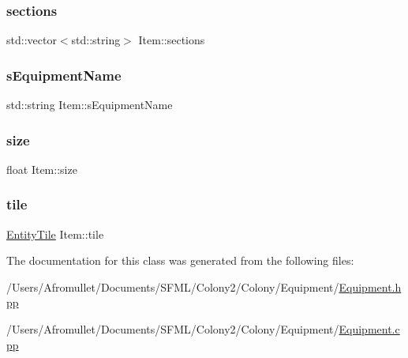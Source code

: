 \mbox{\label{class_item_ad0dfdfafbff3d22f196c19db4ce1eb40}} 
\subsubsection{\texorpdfstring{sections}{sections}}
{\footnotesize\ttfamily std\+::vector$<$std\+::string$>$ Item\+::sections}

\mbox{\label{class_item_ab551fd7ec7c75a6d125cad56fe84b30a}} 
\subsubsection{\texorpdfstring{s\+Equipment\+Name}{sEquipmentName}}
{\footnotesize\ttfamily std\+::string Item\+::s\+Equipment\+Name\hspace{0.3cm}{\ttfamily [private]}}

\mbox{\label{class_item_af6193bebd888e699303f91bee96d9f16}} 
\subsubsection{\texorpdfstring{size}{size}}
{\footnotesize\ttfamily float Item\+::size\hspace{0.3cm}{\ttfamily [private]}}

\mbox{\label{class_item_a1784c30db978d4858e34cf812ff261d5}} 
\subsubsection{\texorpdfstring{tile}{tile}}
{\footnotesize\ttfamily \mbox{\hyperlink{class_entity_tile}{Entity\+Tile}} Item\+::tile}



The documentation for this class was generated from the following files\+:\begin{DoxyCompactItemize}
\item 
/\+Users/\+Afromullet/\+Documents/\+S\+F\+M\+L/\+Colony2/\+Colony/\+Equipment/\mbox{\hyperlink{_equipment_8hpp}{Equipment.\+hpp}}\item 
/\+Users/\+Afromullet/\+Documents/\+S\+F\+M\+L/\+Colony2/\+Colony/\+Equipment/\mbox{\hyperlink{_equipment_8cpp}{Equipment.\+cpp}}\end{DoxyCompactItemize}
